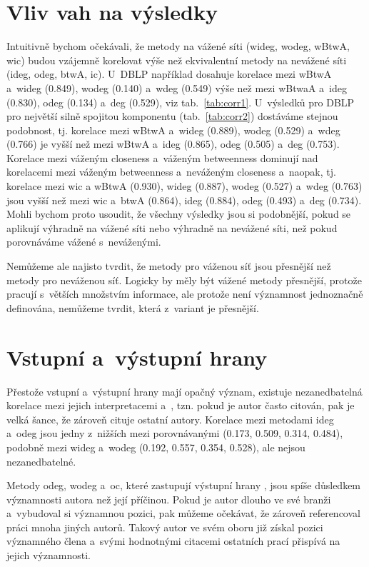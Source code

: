 \documentclass{bakalarka}
\begin{document}
\section{Vliv vah na výsledky}
Intuitivně bychom očekávali, že metody na vážené síti (wideg, wodeg, wBtwA,
wic) budou vzájemně korelovat výše než ekvivalentní metody na nevážené síti
(ideg, odeg, btwA, ic). U~DBLP například dosahuje korelace mezi wBtwA a~wideg
(0.849), wodeg (0.140) a~wdeg (0.549) výše než mezi wBtwaA a~ideg (0.830), odeg
(0.134) a~deg (0.529), viz tab.~\ref{tab:corr1}. U~výsledků pro DBLP pro
největší silně spojitou komponentu (tab.~\ref{tab:corr2}) dostáváme stejnou
podobnost, tj. korelace mezi wBtwA a~wideg (0.889), wodeg (0.529) a~wdeg
(0.766) je vyšší než mezi wBtwA a~ideg (0.865), odeg (0.505) a~deg (0.753).
Korelace mezi váženým closeness a~váženým betweenness dominují nad korelacemi
mezi váženým betweenness a~neváženým closeness a~naopak, tj. korelace mezi wic
a wBtwA (0.930), wideg (0.887), wodeg (0.527) a~wdeg (0.763) jsou vyšší než
mezi wic a~btwA (0.864), ideg (0.884), odeg (0.493) a~deg (0.734). Mohli bychom
proto usoudit, že všechny výsledky jsou si podobnější, pokud se aplikují
výhradně na vážené síti nebo výhradně na nevážené síti, než pokud porovnáváme
vážené s~neváženými.

Nemůžeme ale najisto tvrdit, že metody pro váženou síť jsou přesnější než
metody pro neváženou síť. Logicky by měly být vážené metody přesnější, protože
pracují s~větších množstvím informace, ale protože není významnost jednoznačně
definována, nemůžeme tvrdit, která z~variant je přesnější.

\section{Vstupní a~výstupní hrany}
Přestože vstupní a~výstupní hrany mají opačný význam, existuje nezanedbatelná
korelace mezi jejich interpretacemi  a~, tzn. pokud
je autor často citován, pak je velká šance, že zároveň cituje ostatní autory.
Korelace mezi metodami ideg a~odeg jsou jedny z~nižších mezi porovnávanými
(0.173, 0.509, 0.314, 0.484), podobně mezi wideg a~wodeg (0.192, 0.557, 0.354,
0.528), ale nejsou nezanedbatelné.

Metody odeg, wodeg a~oc, které zastupují výstupní hrany , jsou spíše
důsledkem významnosti autora než její příčinou. Pokud je autor dlouho ve své
branži a~vybudoval si významnou pozici, pak můžeme očekávat, že zároveň
referencoval práci mnoha jiných autorů. Takový autor ve svém oboru již získal
pozici významného člena a~svými hodnotnými citacemi ostatních prací přispívá na
jejich významnosti.
\end{document}
